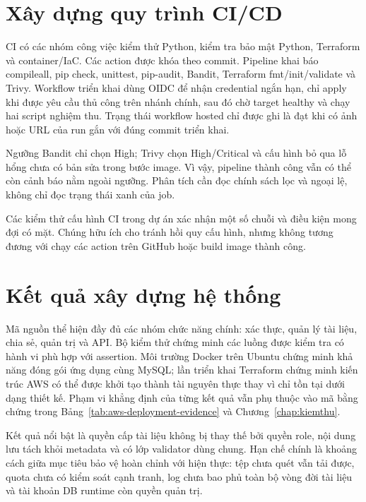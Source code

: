 \section{Xây dựng quy trình CI/CD}
CI có các nhóm công việc kiểm thử Python, kiểm tra bảo mật Python, Terraform và container/IaC. Các action được khóa theo commit. Pipeline khai báo compileall, pip check, unittest, pip-audit, Bandit, Terraform fmt/init/validate và Trivy. Workflow triển khai dùng OIDC để nhận credential ngắn hạn, chỉ apply khi được yêu cầu thủ công trên nhánh chính, sau đó chờ target healthy và chạy hai script nghiệm thu. Trạng thái workflow hosted chỉ được ghi là đạt khi có ảnh hoặc URL của run gắn với đúng commit triển khai.

Ngưỡng Bandit chỉ chọn High; Trivy chọn High/Critical và cấu hình bỏ qua lỗ hổng chưa có bản sửa trong bước image. Vì vậy, pipeline thành công vẫn có thể còn cảnh báo nằm ngoài ngưỡng. Phân tích cần đọc chính sách lọc và ngoại lệ, không chỉ đọc trạng thái xanh của job.

Các kiểm thử cấu hình CI trong dự án xác nhận một số chuỗi và điều kiện mong đợi có mặt. Chúng hữu ích cho tránh hồi quy cấu hình, nhưng không tương đương với chạy các action trên GitHub hoặc build image thành công.

\section{Kết quả xây dựng hệ thống}
Mã nguồn thể hiện đầy đủ các nhóm chức năng chính: xác thực, quản lý tài liệu, chia sẻ, quản trị và API. Bộ kiểm thử chứng minh các luồng được kiểm tra có hành vi phù hợp với assertion. Môi trường Docker trên Ubuntu chứng minh khả năng đóng gói ứng dụng cùng MySQL; lần triển khai Terraform chứng minh kiến trúc AWS có thể được khởi tạo thành tài nguyên thực thay vì chỉ tồn tại dưới dạng thiết kế. Phạm vi khẳng định của từng kết quả vẫn phụ thuộc vào mã bằng chứng trong Bảng~\ref{tab:aws-deployment-evidence} và Chương~\ref{chap:kiemthu}.

Kết quả nổi bật là quyền cấp tài liệu không bị thay thế bởi quyền role, nội dung lưu tách khỏi metadata và có lớp validator dùng chung. Hạn chế chính là khoảng cách giữa mục tiêu bảo vệ hoàn chỉnh với hiện thực: tệp chưa quét vẫn tải được, quota chưa có kiểm soát cạnh tranh, log chưa bao phủ toàn bộ vòng đời tài liệu và tài khoản DB runtime còn quyền quản trị.

